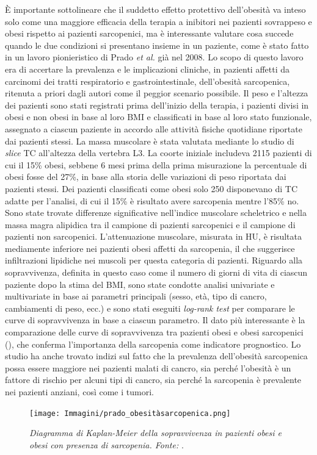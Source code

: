 È importante sottolineare che il suddetto effetto protettivo dell'obesità va inteso solo come una maggiore efficacia della terapia a inibitori nei pazienti sovrappeso e obesi rispetto ai pazienti sarcopenici, ma è interessante valutare cosa succede quando le due condizioni si presentano insieme in un paziente, come è stato fatto in un lavoro pionieristico di Prado \textit{et al.} \cite{Prado2008} già nel 2008. Lo scopo di questo lavoro era di accertare la prevalenza e le implicazioni cliniche, in pazienti affetti da carcinomi dei tratti respiratorio e gastrointestinale, dell'obesità sarcopenica, ritenuta a priori dagli autori come il peggior scenario possibile. Il peso e l’altezza dei pazienti sono stati registrati prima dell'inizio della terapia, i pazienti divisi in obesi e non obesi in base al loro BMI e classificati in base al loro stato funzionale, assegnato a ciascun paziente in accordo alle attività fisiche quotidiane riportate dai pazienti stessi. La massa muscolare è stata valutata mediante lo studio di \textit{slice} TC all'altezza della vertebra L3. La coorte iniziale includeva 2115 pazienti di cui il 15\% obesi, sebbene 6 mesi prima della prima misurazione la percentuale di obesi fosse del 27\%, in base alla storia delle variazioni di peso riportata dai pazienti stessi. Dei pazienti classificati come obesi solo 250 disponevano di TC adatte per l’analisi, di cui il 15\% è risultato avere sarcopenia mentre l’85\% no. Sono state trovate differenze significative nell'indice muscolare scheletrico e nella massa magra alipidica tra il campione di pazienti sarcopenici e il campione di pazienti non sarcopenici. L’attenuazione muscolare, misurata in HU, è risultata mediamente inferiore nei pazienti obesi affetti da sarcopenia, il che suggerisce infiltrazioni lipidiche nei muscoli per questa categoria di pazienti. Riguardo alla sopravvivenza, definita in questo caso come il numero di giorni di vita di ciascun paziente dopo la stima del BMI, sono state condotte analisi univariate e multivariate in base ai parametri principali (sesso, età, tipo di cancro, cambiamenti di peso, ecc.) e sono stati eseguiti \textit{log-rank test} per comparare le curve di sopravvivenza in base a ciascun parametro. Il dato più interessante è la comparazione delle curve di sopravvivenza tra pazienti obesi e obesi sarcopenici (), che conferma l'importanza della sarcopenia come indicatore prognostico. Lo studio ha anche trovato indizi sul fatto che la prevalenza dell'obesità sarcopenica possa essere maggiore nei pazienti malati di cancro, sia perché l’obesità è un fattore di rischio per alcuni tipi di cancro, sia perché la sarcopenia è prevalente nei pazienti anziani, così come i tumori.
\begin{figure}[htp]
\centering
\texttt{[image: Immagini/prado\_obesitàsarcopenica.png]}
\caption{\label{fig:prado_obesitàsarcopenica} \textit{Diagramma di Kaplan-Meier della sopravvivenza in pazienti obesi e obesi con presenza di sarcopenia. Fonte:} \cite{Prado2008}.}
\end{figure}

